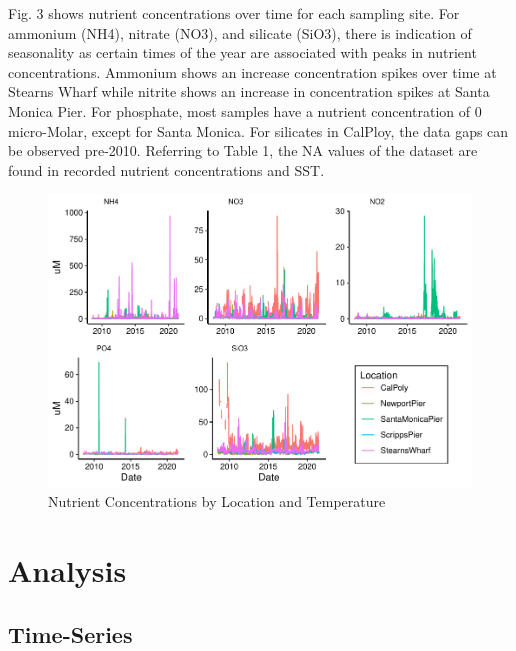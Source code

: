 \documentclass[
  12pt,
]{article}
\begin{document}
\newpage

Fig. 3 shows nutrient concentrations over time for each sampling site.
For ammonium (NH4), nitrate (NO3), and silicate (SiO3), there is
indication of seasonality as certain times of the year are associated
with peaks in nutrient concentrations. Ammonium shows an increase
concentration spikes over time at Stearns Wharf while nitrite shows an
increase in concentration spikes at Santa Monica Pier. For phosphate,
most samples have a nutrient concentration of 0 micro-Molar, except for
Santa Monica. For silicates in CalPloy, the data gaps can be observed
pre-2010. Referring to Table 1, the NA values of the dataset are found
in recorded nutrient concentrations and SST.

\begin{figure}
\centering
\includegraphics{Habs_Final_Report_files/figure-latex/Exploratory Analysis Part 3-1.pdf}
\caption{Nutrient Concentrations by Location and Temperature}
\end{figure}

\newpage

\hypertarget{analysis}{%
\section{Analysis}\label{analysis}}

\hypertarget{time-series}{%
\subsection{Time-Series}\label{time-series}}
\end{document}
